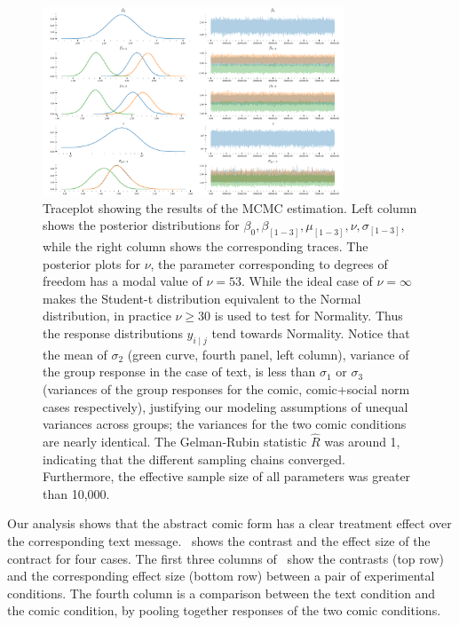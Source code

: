 \begin{figure}
    \centering
	\includegraphics[width=0.8\textwidth]{./hari-code/robust_traceplot.pdf}
    \caption{Traceplot showing the results of the MCMC estimation. Left column shows the posterior distributions for $\beta_0, \beta_{[1-3]}, \mu_{[1-3]}, \nu, \sigma_{[1-3]}$, while the right column shows the corresponding traces. The posterior plots for $\nu$, the parameter corresponding to degrees of freedom has a modal value of $\nu=53$. While the ideal case of $\nu=\infty$ makes the Student-t distribution equivalent to the Normal distribution, in practice $\nu \geq 30$ is used to test for Normality. Thus the response distributions $y_{i \mid j}$ tend towards Normality. Notice that the mean of $\sigma_2$ (green curve, fourth panel, left column), variance of the group response in the case of text, is less than $\sigma_1$ or $\sigma_3$ (variances of the group responses for the comic, comic+social norm cases respectively), justifying our modeling assumptions of unequal variances across groups; the variances for the two comic conditions are nearly identical. The Gelman-Rubin statistic $\hat{R}$ was around 1, indicating that the different sampling chains converged. Furthermore, the effective sample size of all parameters was greater than 10,000. }
	\label{fig:traceplot}
\end{figure}

 

Our analysis shows that the abstract comic form has a clear treatment effect over the corresponding text message.~ shows the contrast and the effect size of the contract for four cases. The first three columns of~ show the contrasts (top row) and the corresponding effect size (bottom row) between a pair of experimental conditions. The fourth column is a comparison between the text condition and the comic condition, by pooling together responses of the two comic conditions.


